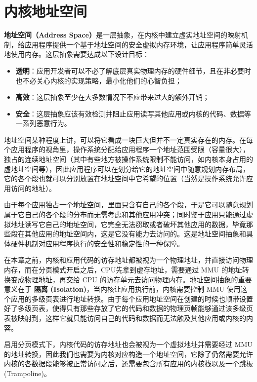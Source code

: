 \section{内核地址空间}

\textbf{地址空间（Address Space）}是一层抽象，在内核中建立虚实地址空间的映射机制，给应用程序提供一个基于地址空间的安全虚拟内存环境，让应用程序简单灵活地使用内存。这层抽象需要达成以下设计目标：
\begin{itemize}
	\item \textbf{透明}：应用开发者可以不必了解底层真实物理内存的硬件细节，且在非必要时也不必关心内核的实现策略，最小化他们的心智负担；
	\item \textbf{高效}：这层抽象至少在大多数情况下不应带来过大的额外开销；
	\item \textbf{安全}：这层抽象应该有效检测并阻止应用读写其他应用或内核的代码、数据等一系列恶意行为。
\end{itemize}

地址空间某种程度上讲，可以将它看成一块巨大但并不一定真实存在的内存。在每个应用程序的视角里，操作系统分配给应用程序一个地址范围受限（容量很大），独占的连续地址空间（其中有些地方被操作系统限制不能访问，如内核本身占用的虚地址空间等），因此应用程序可以在划分给它的地址空间中随意规划内存布局，它的各个段也就可以分别放置在地址空间中它希望的位置（当然是操作系统允许应用访问的地址）。

由于每个应用独占一个地址空间，里面只含有自己的各个段，于是它可以随意规划属于它自己的各个段的分布而无需考虑和其他应用冲突；同时鉴于应用只能通过虚拟地址读写它自己的地址空间，它完全无法窃取或者破坏其他应用的数据，毕竟那些段在其他应用的地址空间内，这是它没有能力去访问的。这是地址空间抽象和具体硬件机制对应用程序执行的安全性和稳定性的一种保障。

在本章之前，内核和应用代码的访存地址都被视为一个物理地址，并直接访问物理内存，而在分页模式开启之后，CPU先拿到虚存地址，需要通过 MMU 的地址转换变成物理地址，再交给 CPU 的访存单元去访问物理内存。地址空间抽象的重要意义在于 \textbf{隔离 (Isolation)}，当内核让应用执行前，内核需要控制 MMU 使用这个应用的多级页表进行地址转换。由于每个应用地址空间在创建的时候也顺带设置好了多级页表，使得只有那些存放了它的代码和数据的物理页帧能够通过该多级页表被映射到，这样它就只能访问自己的代码和数据而无法触及其他应用或内核的内容。

启用分页模式下，内核代码的访存地址也会被视为一个虚拟地址并需要经过 MMU 的地址转换，因此我们也需要为内核对应构造一个地址空间，它除了仍然需要允许内核的各数据段能够被正常访问之后，还需要包含所有应用的内核栈以及一个跳板 (Trampoline)。

